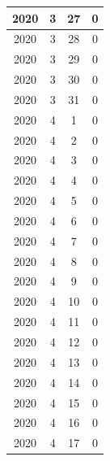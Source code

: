 \begin{longtable} {|c|c|c|c|}
\hline
2020         & 3            & 27           & 0                         \\ 
\hline
2020         & 3            & 28           & 0                         \\ 
\hline
2020         & 3            & 29           & 0                         \\ 
\hline
2020         & 3            & 30           & 0                         \\ 
\hline
2020         & 3            & 31           & 0                         \\ 
\hline
2020         & 4            & 1            & 0                         \\ 
\hline
2020         & 4            & 2            & 0                         \\ 
\hline
2020         & 4            & 3            & 0                         \\ 
\hline
2020         & 4            & 4            & 0                         \\ 
\hline
2020         & 4            & 5            & 0                         \\ 
\hline
2020         & 4            & 6            & 0                         \\ 
\hline
2020         & 4            & 7            & 0                         \\ 
\hline
2020         & 4            & 8            & 0                         \\ 
\hline
2020         & 4            & 9            & 0                         \\ 
\hline
2020         & 4            & 10           & 0                         \\ 
\hline
2020         & 4            & 11           & 0                         \\ 
\hline
2020         & 4            & 12           & 0                         \\ 
\hline
2020         & 4            & 13           & 0                         \\ 
\hline
2020         & 4            & 14           & 0                         \\ 
\hline
2020         & 4            & 15           & 0                         \\ 
\hline
2020         & 4            & 16           & 0                         \\ 
\hline
2020         & 4            & 17           & 0                         \\ 

\end{longtable}
